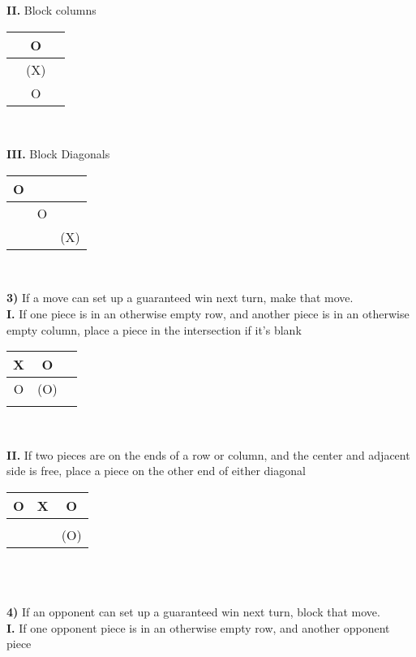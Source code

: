 \documentclass[12pt]{article}
\newcommand\tab[1][3cm]{\hspace*{#1}}
\begin{document}
\tab\textbf{II.} Block columns \\
\begin{center}
	\begin{tabular}{c|c|c}
		  & O &   \\      \hline
		  &(X)&   \\      \hline
		  & O &  
	  \end{tabular} \\
	\end{center}
\tab\textbf{III.} Block Diagonals \\
\begin{center}
	\begin{tabular}{c|c|c}
		O &   &  \\      \hline
		  & O &  \\      \hline
		  &   &(X)
	  \end{tabular} \\
	\end{center}
\pagebreak 
\textbf{3)} If a move can set up a guaranteed win next turn, make that move. \\
\tab\textbf{I.} If one piece is in an otherwise empty row, and another piece is in an otherwise 
	\tab\;\;\;\;empty column, place a piece in the intersection if it's blank \\
\begin{center}
\begin{tabular}{c|c|c}
	X & O &   \\      \hline
	O &(O)&   \\      \hline
	  &   &  
  \end{tabular} \\
\end{center}
\tab\textbf{II.} If two pieces are on the ends of a row or column, and the center and adjacent 
	\tab\;\;\;\;\;\;side is free, place a piece on the other end of either diagonal \\
\begin{center}
	\begin{tabular}{c|c|c}
		O & X & O \\      \hline
		  &   &   \\      \hline
		  &   &(O) 
	  \end{tabular} \\
	\end{center}
~\\
\textbf{4)} If an opponent can set up a guaranteed win next turn, block that move. \\
\tab\textbf{I.} If one opponent piece is in an otherwise empty row, and another opponent piece 
\end{document}
